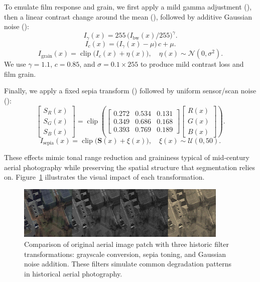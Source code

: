 To emulate film response and grain, we first apply a mild gamma adjustment (), then a linear contrast change around the mean (), followed by additive Gaussian noise ():
\begin{equation}
I_{\gamma}(x) = 255\,\big(I_{\text{bw}}(x)/255\big)^{\gamma}.
\label{eq:gamma}
\end{equation}
\begin{equation}
I_{c}(x) = \big(I_{\gamma}(x) - \mu\big)\,c + \mu.
\label{eq:contrast}
\end{equation}
\begin{equation}
I_{\text{grain}}(x) = \operatorname{clip}\big(I_{c}(x) + \eta(x)\big),\quad \eta(x)\sim\mathcal{N}(0,\sigma^2).
\label{eq:grain}
\end{equation}
We use $\gamma=1.1$, $c=0.85$, and $\sigma=0.1\times 255$ to produce mild contrast loss and film grain.

Finally, we apply a fixed sepia transform () followed by uniform sensor/scan noise ():
\begin{equation}
\begin{bmatrix} S_R(x) \\ S_G(x) \\ S_B(x) \end{bmatrix}
= \operatorname{clip}\left(
\begin{bmatrix}
0.272 & 0.534 & 0.131 \\
0.349 & 0.686 & 0.168 \\
0.393 & 0.769 & 0.189
\end{bmatrix}
\begin{bmatrix} R(x) \\ G(x) \\ B(x) \end{bmatrix}
\right).
\label{eq:sepia}
\end{equation}
\begin{equation}
I_{\text{sepia}}(x) = \operatorname{clip}\big(\mathbf{S}(x) + \xi(x)\big),\quad \xi(x)\sim\mathcal{U}(0,50).
\label{eq:sepia_noise}
\end{equation}

These effects mimic tonal range reduction and graininess typical of mid‑century aerial photography while preserving the spatial structure that segmentation relies on. Figure~\ref{fig:historic_filters} illustrates the visual impact of each transformation.

\begin{figure}[t]
\centering
\includegraphics[width=0.9\textwidth]{./images/filters.png}
\caption{Comparison of original aerial image patch with three historic filter transformations: grayscale conversion, sepia toning, and Gaussian noise addition. These filters simulate common degradation patterns in historical aerial photography.}
\label{fig:historic_filters}
\end{figure}

